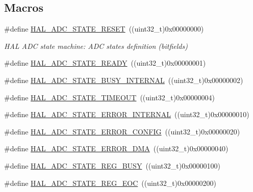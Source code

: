 \subsection*{Macros}
\begin{DoxyCompactItemize}
\item 
\#define \hyperlink{group___a_d_c___exported___types_ga3f995b6dedd7366d0663f852511b9104}{H\-A\-L\-\_\-\-A\-D\-C\-\_\-\-S\-T\-A\-T\-E\-\_\-\-R\-E\-S\-E\-T}~((uint32\-\_\-t)0x00000000)
\begin{DoxyCompactList}\small\item\em H\-A\-L A\-D\-C state machine\-: A\-D\-C states definition (bitfields) \end{DoxyCompactList}\item 
\#define \hyperlink{group___a_d_c___exported___types_gadccf2475d321f82bc5b18b4c0031794b}{H\-A\-L\-\_\-\-A\-D\-C\-\_\-\-S\-T\-A\-T\-E\-\_\-\-R\-E\-A\-D\-Y}~((uint32\-\_\-t)0x00000001)
\item 
\#define \hyperlink{group___a_d_c___exported___types_ga7055248355e179ee208d23bd2ce8ba69}{H\-A\-L\-\_\-\-A\-D\-C\-\_\-\-S\-T\-A\-T\-E\-\_\-\-B\-U\-S\-Y\-\_\-\-I\-N\-T\-E\-R\-N\-A\-L}~((uint32\-\_\-t)0x00000002)
\item 
\#define \hyperlink{group___a_d_c___exported___types_gaaa31ad8c2f5337eac601534cb581dd15}{H\-A\-L\-\_\-\-A\-D\-C\-\_\-\-S\-T\-A\-T\-E\-\_\-\-T\-I\-M\-E\-O\-U\-T}~((uint32\-\_\-t)0x00000004)
\item 
\#define \hyperlink{group___a_d_c___exported___types_ga65b592627f1f9277f4b89bfc33a9e641}{H\-A\-L\-\_\-\-A\-D\-C\-\_\-\-S\-T\-A\-T\-E\-\_\-\-E\-R\-R\-O\-R\-\_\-\-I\-N\-T\-E\-R\-N\-A\-L}~((uint32\-\_\-t)0x00000010)
\item 
\#define \hyperlink{group___a_d_c___exported___types_ga22d43a637ce63e13e33f5a0f1d4564fd}{H\-A\-L\-\_\-\-A\-D\-C\-\_\-\-S\-T\-A\-T\-E\-\_\-\-E\-R\-R\-O\-R\-\_\-\-C\-O\-N\-F\-I\-G}~((uint32\-\_\-t)0x00000020)
\item 
\#define \hyperlink{group___a_d_c___exported___types_ga5a1b4881d17e72aa0823797958221172}{H\-A\-L\-\_\-\-A\-D\-C\-\_\-\-S\-T\-A\-T\-E\-\_\-\-E\-R\-R\-O\-R\-\_\-\-D\-M\-A}~((uint32\-\_\-t)0x00000040)
\item 
\#define \hyperlink{group___a_d_c___exported___types_ga516d4b4ebc261c241c69d96aae19acc3}{H\-A\-L\-\_\-\-A\-D\-C\-\_\-\-S\-T\-A\-T\-E\-\_\-\-R\-E\-G\-\_\-\-B\-U\-S\-Y}~((uint32\-\_\-t)0x00000100)
\item 
\#define \hyperlink{group___a_d_c___exported___types_gae2da191bffb720a553a1e39c10929711}{H\-A\-L\-\_\-\-A\-D\-C\-\_\-\-S\-T\-A\-T\-E\-\_\-\-R\-E\-G\-\_\-\-E\-O\-C}~((uint32\-\_\-t)0x00000200)

\end{DoxyCompactItemize}
